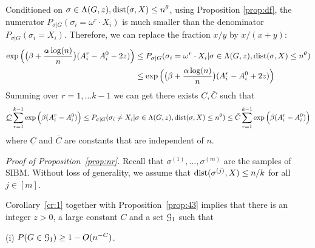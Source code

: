 \documentclass{article}
\begin{document}
\begin{remark}
	Conditioned on $\sigma\in \Lambda(G,z) ,\operatorname{dist}(\sigma, X) \le n^{\theta} $,
	using Proposition \ref{prop:df}, the numerator $P_{\sigma | G}(\sigma_i = \omega^r \cdot X_i)$ is much smaller than the denominator
	$P_{\sigma | G}(\sigma_ i = X_i)$.
	Therefore, we can replace the fraction $x/y$ by $x/(x+y)$:
	\begin{align*}
	\exp\Big(\big(\beta+\frac{\alpha\log(n)}{n} \big) (A^r_i-A^0_i - 2z) \Big) & \le 
	P_{\sigma|G}(\sigma_i= \omega^r \cdot X_i | \sigma\in \Lambda(G,z) ,\operatorname{dist}(\sigma, X) \le n^{\theta} )
	 \\
	& \le \exp\Big(\big(\beta+\frac{\alpha\log(n)}{n} \big) (A^r_i-A^0_i + 2z) \Big)
	\end{align*}
	Summing over $r=1, \dots k-1$ we can get there exists $\underline{C}, \bar{C}$ such that
	\begin{equation} \label{eq:qke}
	\underline{C}\sum_{r=1}^{k-1}\exp\Big(\beta(A^r_i-A^0_i) \Big)  \le 
	P_{\sigma|G}(\sigma_i \neq X_i | \sigma \in \Lambda(G, z),
	\operatorname{dist}(\sigma, X) \leq n^{\theta})
	\le \bar{C} \sum_{r=1}^{k-1}\exp\Big(\beta (A^r_i-A^0_i ) \Big) 
	\end{equation}
	where $\underline{C}$ and $\overline{C}$ are constants that are independent of $n$.
\end{remark}

\noindent
{\em Proof of Proposition~\ref{prop:nr}.}
Recall that $\sigma^{(1)},\dots,\sigma^{(m)}$ are the samples of SIBM.
Without loss of generality, we assume that 
$\operatorname{dist}(\sigma^{(j)}, X) \le n/k$ for all $j\in[m]$. 

Corollary~\ref{cr:1} together with Proposition~\ref{prop:43} implies that there is an integer $z>0$,
a large constant $C$ and a set $\mathcal{G}_{1}$ such that

\noindent (i)
$P(G\in\mathcal{G}_{1}) \ge 1- O(n^{-C})$.
\end{document}
